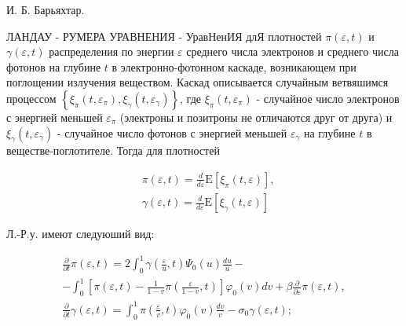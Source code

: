 \documentclass[10pt]{article}
\begin{document}
И. Б. Барьяхтар.



ЛАНДАУ - РУМЕРА УРАВНЕНИЯ - УравНенИЯ длЯ плотностей $\pi(\varepsilon, t)$ и $\gamma(\varepsilon, t)$ распределения по энергии $\varepsilon$ среднего числа электронов и среднего числа фотонов на глубине $t$ в электронно-фотонном каскаде, возникающем при поглощении излучения веществом. Каскад описывается случайным ветвяшимся процессом $\left\{\xi_{\pi}\left(t, \varepsilon_{\pi}\right), \xi_{\gamma}\left(t, \varepsilon_{\gamma}\right)\right\}$, где $\xi_{\pi}\left(t, \varepsilon_{\pi}\right)$ - случайное число электронов с энергией меньшей $\varepsilon_{\pi}$ (электроны и позитроны не отличаются друг от друга) и $\xi_{\gamma}\left(t, \varepsilon_{\gamma}\right)$ - случайное число фотонов с энергией меньшей $\varepsilon_{\gamma}$ на глубине $t$ в веществе-поглотителе. Тогда для плотностей



\[

\begin{aligned}

& \pi(\varepsilon, t)=\frac{d}{d \varepsilon} \mathrm{E}\left[\xi_{\pi}(t, \varepsilon)\right], \\

& \gamma(\varepsilon, t)=\frac{d}{d \varepsilon} \mathrm{E}\left[\xi_{\gamma}(t, \varepsilon)\right]

\end{aligned}

\]



Л.-Р.у. имеют следуюший вид:



\[

\begin{gathered}

\frac{\partial}{\partial t} \pi(\varepsilon, t)=2 \int_{0}^{1} \gamma\left(\frac{\varepsilon}{u}, t\right) \Psi_{0}(u) \frac{d u}{u}- \\

-\int_{0}^{1}\left[\pi(\varepsilon, t)-\frac{1}{1-v} \pi\left(\frac{\varepsilon}{1-v}, t\right)\right] \varphi_{0}(v) d v+\beta \frac{\partial}{\partial \varepsilon} \pi(\varepsilon, t), \\

\frac{\partial}{\partial t} \gamma(\varepsilon, t)=\int_{0}^{1} \pi\left(\frac{\varepsilon}{v}, t\right) \varphi_{0}(v) \frac{d v}{v}-\sigma_{0} \gamma(\varepsilon, t) ;

\end{gathered}

\]
\end{document}
